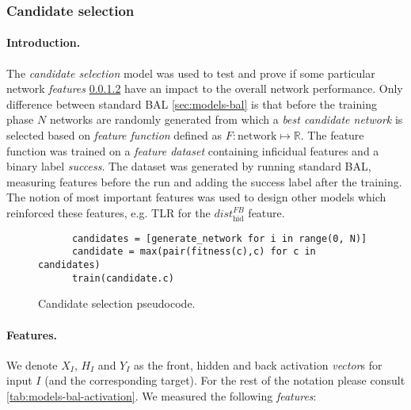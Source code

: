 \subsubsection{Candidate selection} 
\label{sec:sim-exp-candidates}

\paragraph{Introduction.} 
The \emph{candidate selection} model was used to test and prove if some particular network \emph{features} \ref{sec:our-candidates-features} have an impact to the overall network performance. Only difference between standard BAL \ref{sec:models-bal} is that before the training phase $N$ networks are randomly generated from which a \emph{best candidate network} is selected based on \emph{feature function} defined as $F: \mbox{network} \mapsto \mathbb{R}$. The feature function was trained on a \emph{feature dataset} containing inficidual features and a binary label \emph{success}. The dataset was generated by running standard BAL, measuring features before the run and adding the success label after the training. The notion of most important features was used to design other models which reinforced these features, e.g. TLR for the $dist_{\mbox{hid}}^{FB}$ feature. 

\begin{figure}[H]
    \begin{lstlisting} 
      candidates = [generate_network for i in range(0, N)] 
      candidate = max(pair(fitness(c),c) for c in candidates) 
      train(candidate.c) 
    \end{lstlisting} 
  \caption{Candidate selection pseudocode.}
  \label{fig:our-candidates-pseudocode} 
\end{figure} 

\paragraph{Features.}
\label{sec:our-candidates-features}

We denote $X_I$, $H_I$ and $Y_I$ as the front, hidden and back activation \emph{vector}s for input $I$ (and the corresponding target). For the rest of the notation please consult \ref{tab:models-bal-activation}. We measured the following \emph{features}: 

